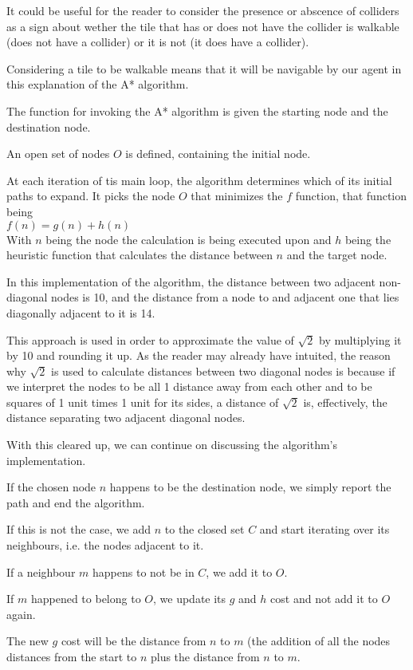 It could be useful for the reader to consider the presence or abscence of
colliders as a sign about wether the tile that has or does not have the
collider is walkable (does not have a collider) or it is not (it does have
a collider).

Considering a tile to be walkable means that it will be navigable by our
agent in this explanation of the A* algorithm.

The function for invoking the A* algorithm is given the starting
node and the destination node.

An open set of nodes $O$ is defined, containing the initial node.

At each iteration of tis main loop, the algorithm determines which of its
initial paths to expand. It picks the node $O$ that minimizes the $f$
function, that function being
\\
$f(n) = g(n) + h(n)$
\\
With $n$ being the node the calculation is being executed upon 
and $h$ being the heuristic function that calculates
the distance between $n$ and the target node.

In this implementation of the algorithm, the distance between two adjacent
non-diagonal nodes is 10, and the distance from a node to and adjacent
one that lies diagonally adjacent to it is 14. 

This approach is used in order
to approximate the value of $\sqrt{2}$ by multiplying it by 10 and rounding
it up. As the reader may already have intuited, the reason why $\sqrt{2}$ is
used to calculate distances between two diagonal nodes is because if
we interpret the nodes to be all 1 distance away from each other and to be
squares of 1 unit times 1 unit for its sides, a distance of $\sqrt{2}$ is,
effectively, the distance separating two adjacent diagonal nodes.

With this cleared up, we can continue on discussing the algorithm's
implementation.

If the chosen node $n$ happens to be the destination node, we simply report
the path and end the algorithm.

If this is not the case, we add $n$ to the closed set $C$ and start iterating
over its neighbours, i.e. the nodes adjacent to it.

If a neighbour $m$ happens to not be in $C$, we add it to $O$.

If $m$ happened to belong to $O$, we update its $g$ and $h$ cost and
not add it to $O$ again.

The new $g$ cost will be the distance from $n$ to $m$ (the addition of
all the nodes distances from the start to $n$ plus the distance from $n$
to $m$.

